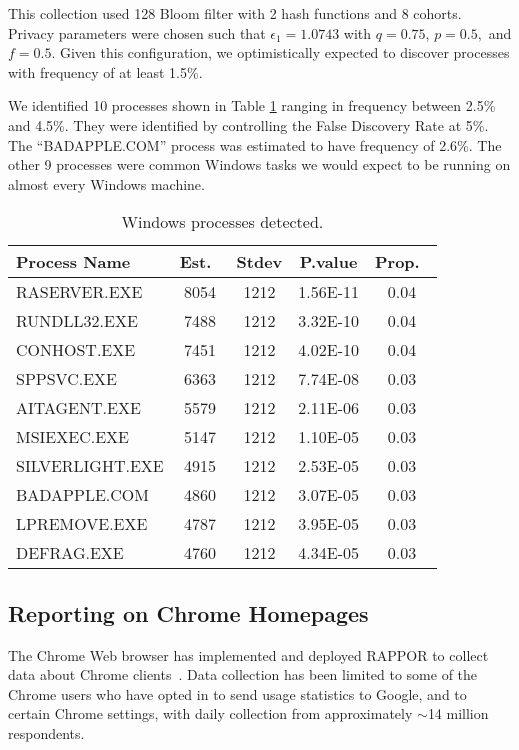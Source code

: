 \documentclass{sig-alternate-2013}
\newcommand\RAPPOR{{RAPPOR}}
\begin{document}
This collection used 128 Bloom filter with 2 hash functions and 8 cohorts. Privacy parameters were chosen such that $\epsilon_1 = 1.0743$ with $q = 0.75$, $p = 0.5,$ and $f = 0.5$. Given this configuration, we optimistically expected to discover processes with frequency of at least 1.5\%.

We identified 10 processes shown in Table \ref{tab:proc} ranging in frequency between 2.5\% and 4.5\%. They were identified by controlling the False Discovery Rate at 5\%. The ``BADAPPLE.COM'' process was estimated to have frequency of 2.6\%. The other 9 processes were common Windows tasks we would expect to be running on almost every Windows machine.

\begin{table}[h]
\centering
\caption{Windows processes detected.}
\begin{tabular}{lcccc}
  \hline
Process Name & Est.\ & Stdev & P.value & Prop.\ \\ \hline
RASERVER.EXE & 8054 & 1212 & 1.56E-11 & 0.04    \\ RUNDLL32.EXE & 7488 & 1212 & 3.32E-10 & 0.04  \\ CONHOST.EXE & 7451 & 1212 & 4.02E-10 & 0.04   \\ SPPSVC.EXE & 6363 & 1212 & 7.74E-08 & 0.03    \\ AITAGENT.EXE & 5579 & 1212 & 2.11E-06 & 0.03  \\ MSIEXEC.EXE & 5147 & 1212 & 1.10E-05 & 0.03   \\ SILVERLIGHT.EXE & 4915 & 1212 & 2.53E-05 & 0.03  \\ BADAPPLE.COM & 4860 & 1212 & 3.07E-05 & 0.03  \\ LPREMOVE.EXE & 4787 & 1212 & 3.95E-05 & 0.03  \\ DEFRAG.EXE & 4760 & 1212 & 4.34E-05 & 0.03    \\ \hline
\end{tabular}
\label{tab:proc}
\end{table}

\subsection{Reporting on Chrome Homepages}\label{sec:chromehome}
The Chrome Web browser has implemented and deployed \RAPPOR{} to collect data about Chrome clients~\cite{ChromeRAPPORpage}.
Data collection has been limited to
some of the Chrome users who have opted in to send usage statistics to Google,
and to certain Chrome settings,
with daily collection 
from approximately $\sim$14 million respondents.
\end{document}
